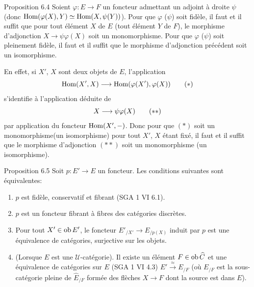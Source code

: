 \documentclass[10pt]{../fichiers-configuration-latex/smfart}
\def\labelenumi{(\theenumi)}
\begin{document}
\begin{enonce*}{Proposition 6.4}
Soient $\varphi:E\rightarrow F$ un foncteur admettant un adjoint à
droite $\psi$ (donc $\operatorname{Hom}(\varphi(X),Y)\simeq \operatorname{Hom}(X,\psi(Y))$).
Pour que $\varphi$ (\resp  $\psi$) soit fidèle, il faut et il suffit
que pour tout élément $X$ de $E$ (\resp  tout élément $Y$ de $F$),
le morphisme d'adjonction $X\rightarrow \psi\varphi(X)$ soit un
monomorphisme. Pour que $\varphi$ (\resp  $\psi$) soit pleinement
fidèle, il faut et il suffit que le morphisme d'adjonction précédent
soit un isomorphisme.
\end{enonce*}
En effet, si $X'$, $X$ sont deux objets de $E$, l'application
\begin{equation*}
\operatorname{Hom}(X',X)\longrightarrow
  \operatorname{Hom}(\varphi(X'),\varphi(X))\tag{$\ast$}
\end{equation*}
s'identifie à l'application déduite de
\begin{equation*}
X\longrightarrow \psi
  \varphi (X)\tag{${\ast}{\ast}$}
\end{equation*}
par application du foncteur $\operatorname{Hom}(X',-)$. Donc pour que $(\ast)$
soit un monomorphisme\pageoriginale (\resp  un isomorphisme) pour
tout $X'$, $X$ étant fixé, il faut et il suffit que le morphisme
d'adjonction $({\ast}{\ast})$ soit un monomorphisme (\resp  un
isomorphisme).

\begin{enonce*}{Proposition 6.5}
Soit $p:E'\rightarrow E$ un foncteur. Les conditions suivantes sont
équivalentes:
\begin{enumerate}
\renewcommand{\theenumi}{\roman{enumi}}
\renewcommand{\labelenumi}{(\theenumi)}
\item $p$ est fidèle, conservatif et fibrant {\rm(SGA 1 VI 6.1).}

\item $p$ est un foncteur fibrant à fibres des catégories
  discrètes.

\item Pour tout $X'\in \operatorname{ob} E'$, le foncteur $E'_{/X'}\rightarrow
  E_{/p(X)}$ induit par $p$ est une équivalence de catégories,
  surjective sur les objets.

\item (Lorsque $E$ est une $𝒰$-catégorie). Il existe un
  élément $F\in \operatorname{ob}\widehat{C}$ et une équivalence de
  catégories sur $E$ {\rm(SGA 1 VI 4.3)} $E'\xrightarrow{\approx}
  E_{/F}$ (où $E_{/F}$ est la sous-catégorie pleine de
  $\widehat{E}_{/F}$ formée des flèches $X\rightarrow F$ dont la
  source est dans $E$).
\end{enumerate}
\end{enonce*}
\end{document}
